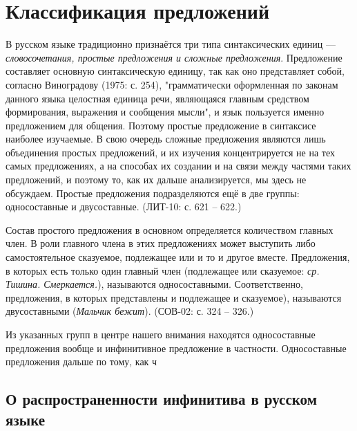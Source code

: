 \section{Классификация предложений}

В русском языке традиционно признаётся три типа синтаксических единиц --- \textit{словосочетания, простые предложения и сложные предложения}. Предложение составляет основную синтаксическую единицу, так как оно представляет собой, согласно Виноградову (1975: с. 254), "грамматически оформленная по законам данного языка целостная единица речи, являющаяся главным средством формирования, выражения и сообщения мысли", и язык пользуется именно предложением для общения. Поэтому простые предложение в синтаксисе наиболее изучаемые. В свою очередь сложные предложения являются лишь объединения простых предложений, и их изучения концентрируется не на тех самых предложениях, а на способах их создании и на связи между частями таких предложений, и поэтому то, как их дальше анализируется, мы здесь не обсуждаем. Простые предложения подразделяются ещё в две группы: односоставные и двусоставные. (ЛИТ-10: с. 621 -- 622.) 

Состав простого предложения в основном определяется количеством главных член. В роли главного члена в этих предложениях может выступить либо самостоятельное сказуемое, подлежащее или и то и другое вместе. Предложения, в которых есть только один главный член (подлежащее или сказуемое: \textit{ср. Тишина. Смеркается.}), называются односоставными. Соответственно, предложения, в которых представлены и подлежащее и сказуемое), называются двусоставными (\textit{Мальчик бежит}). (СОВ-02: с. 324 -- 326.) 

Из указанных групп в центре нашего внимания находятся односоставные предложения вообще и инфинитивное предложение в частности. Односоставные предложения дальше по тому, как ч

\subsection{О распространенности инфинитива в русском языке}


